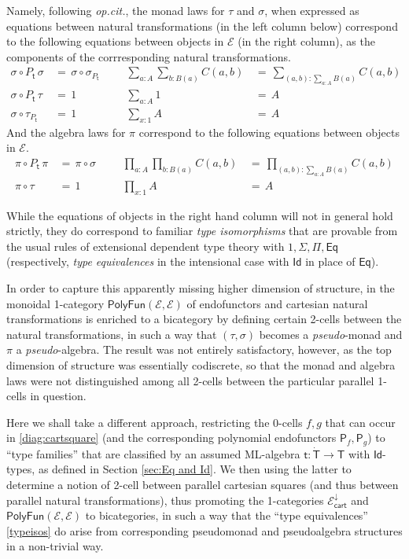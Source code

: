 \documentclass[12pt,reqno]{amsart}
\newcommand{\EE}{\ensuremath{\mathcal{E}}}
\newcommand{\alg}[1]{\ensuremath{\mathsf{#1}}}
\renewcommand{\to}{\ensuremath{\rightarrow}}
\newcommand{\Id}{\mathsf{Id}}
\renewcommand{\t}{\ensuremath{\mathsf{t}}}
\newcommand{\T}{\ensuremath{\mathsf{T}}}
\newcommand{\TT}{\ensuremath{\dot{\mathsf{T}}}}
\theoremstyle{remark}
\theoremstyle{definition}
\begin{document}
Namely, following \emph{op.cit.}, the monad laws for $\tau$ and $\sigma$, when expressed as equations between natural transformations (in the left column below) correspond to the following equations between objects in $\EE$ (in the right column), as the components of the corrresponding natural transformations.
\begin{align*}\textstyle
 \sigma\circ P_\t\, \sigma\, &=\, \sigma\circ\sigma_{P_\t}	&&&	\sum\limits_{a:A}\sum\limits_{b:B(a)}C(a,b)\, &=\, \sum\limits_{(a,b):\sum\limits_{a:A}B(a)}C(a,b)\  \\ 
  \sigma\circ P_\t\,\tau\, &=\, 1 		&&& 	\sum\limits_{a:A}1\, &=\, A   \tag{\theequation}\label{typeisos}\\ 
  \sigma\circ \tau_{P_\t}\, &=\, 1		&&& 	\sum\limits_{x:1}A\, &=\, A  
 \end{align*}
%
And the algebra laws for $\pi$ correspond to the following equations between objects in $\EE$.
%
\begin{align*}
 \pi\circ P_\t\,\pi\, &=\,  \pi\circ\sigma 	&&&	\prod\limits_{a:A}\prod\limits_{b:B(a)}C(a,b)\, 
 									&=\, \prod\limits_{(a,b):\sum_{a:A}B(a)}C(a,b)  \\ 
 \pi\circ \tau\, &=\, 1 	&&& 	\prod\limits_{x:1}A\, &=\, A   \tag{\theequation}
\end{align*}

While the equations of objects in the right hand column will not in general hold strictly, they do correspond to familiar \emph{type isomorphisms} that are provable from the usual rules of extensional dependent type theory with $1, \Sigma, \Pi, \mathsf{Eq}$ (respectively, \emph{type equivalences} in the intensional case with $\mathsf{Id}$ in place of $\mathsf{Eq}$). 

In order to capture this apparently missing higher dimension of structure, in \cite{Newstead:thesis, NA:2018} the monoidal 1-category $\mathsf{PolyFun}(\EE, \EE)$ of endofunctors and cartesian natural transformations is enriched to a bicategory by defining certain 2-cells between the natural transformations, in such a way that $(\tau, \sigma)$ becomes a \emph{pseudo}-monad and $\pi$ a \emph{pseudo}-algebra.  The result was not entirely satisfactory, however, as the top dimension of structure was essentially codiscrete, so that the monad and algebra laws were not distinguished among all 2-cells between the particular parallel 1-cells in question.

Here we shall take a different approach, restricting the 0-cells $f, g$ that can occur in \eqref{diag:cartsquare} (and the corresponding polynomial endofunctors $\alg{P}_f, \alg{P}_g$) to ``type families'' that are  classified by an assumed ML-algebra $\t:\TT \to \T$ with $\Id{}$-types, as defined in Section \ref{sec:Eq and Id}. We then using the latter to determine a notion of 2-cell between parallel cartesian squares (and thus between parallel natural transformations), thus promoting the 1-categories $\EE^{\downarrow}_{\mathsf{cart}}$ and $\mathsf{PolyFun}(\EE, \EE)$ to bicategories, in such a way that the ``type equivalences'' \eqref{typeisos} do arise from corresponding pseudomonad and pseudoalgebra structures in a non-trivial way.
\end{document}
